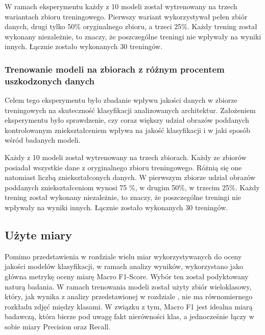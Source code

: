 W ramach eksperymentu każdy z 10 modeli został wytrenowany na trzech wariantach zbioru treningowego. Pierwszy wariant wykorzystywał pełen zbiór danych, drugi  tylko 50\% oryginalnego zbioru, a trzeci 25\%. Każdy trening został wykonany niezależnie, to znaczy, że poszczególne treningi nie wpływały na wyniki innych.  Łącznie zostało wykonanych 30 treningów.


\subsubsection{Trenowanie modeli na zbiorach z różnym procentem uszkodzonych danych}
Celem tego eksperymentu było zbadanie wpływu jakości danych w zbiorze treningowych na skuteczność klasyfikacji analizowanych architektur. Założeniem eksperymentu było sprawdzenie, czy coraz większy udział obrazów poddanych kontrolowanym zniekształceniem wpływa na jakość klasyfikacji i w jaki sposób wśród badanych modeli.

Każdy z 10 modeli został wytrenowany na trzech zbiorach. Każdy ze zbiorów posiadał wszystkie dane z oryginalnego zbioru treningowego. Różnią się one natomiast liczbą zniekształconych danych. W pierwszym zbiorze udział obrazów poddanych zniekształceniom wynosi 75 \%, w drugim 50\%, w trzecim 25\%.  Każdy trening został wykonany niezależnie, to znaczy, że poszczególne treningi nie wpływały na wyniki innych.  Łącznie zostało wykonanych 30 treningów. 


\subsection{Użyte miary}
Pomimo przedstawienia w rozdziale wielu miar wykorzystywanych do oceny jakości modelów klasyfikacji, w ramach analizy wyników, wykorzystano jako główna metrykę oceny miarę Macro F1-Score. Wybór ten został podyktowany naturą badania. W ramach trenowania modeli został użyty zbiór wieloklasowy, który, jak wynika z analizy przedstawionej w rozdziale , nie ma równomiernego rozkładu zdjęć między klasami. W związku \newline z tym, Macro F1 jest idealna miarą badawczą, która bierze pod uwagę fakt nierówności klas, a jednocześnie łączy w sobie miary Precision oraz Recall. 
\clearpage